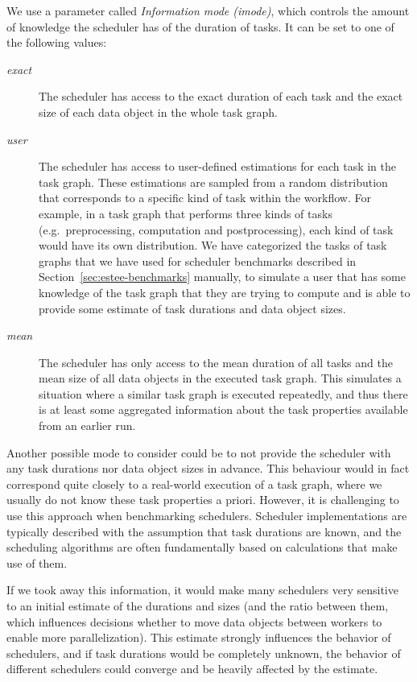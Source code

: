 \begin{description}
		We use a parameter called \emph{Information mode (imode)}, which controls the amount of knowledge the
		scheduler has of the duration of tasks. It can be set to one of the following values:
		\begin{description}
			\item[\emph{exact}] The scheduler has access to the exact duration of each task and the exact size of each data object
				in the whole task graph.
			\item[\emph{user}] The scheduler has access to user-defined estimations for each task in the task graph. These
				estimations are sampled from a random distribution that corresponds to a specific kind of task
				within the workflow. For example, in a task graph that performs three kinds of tasks (e.g.\
				preprocessing, computation and postprocessing), each kind of task would have its own distribution.
				We have categorized the tasks of task graphs that we have used for scheduler benchmarks described
				in Section~\ref{sec:estee-benchmarks} manually, to simulate a user that has some knowledge of the task
				graph that they are trying to compute and is able to provide some estimate of task durations and
				data object sizes.
			\item[\emph{mean}] The scheduler has only access to the mean duration of all tasks and the mean size of all data
				objects in the executed task graph. This simulates a situation where a similar task graph is
				executed repeatedly, and thus there is at least some aggregated information about the task
				properties available from an earlier run.
		\end{description}
		Another possible mode to consider could be to not provide the scheduler with any task durations nor
		data object sizes in advance. This behaviour would in fact correspond quite closely to a real-world
		execution of a task graph, where we usually do not know these task properties a priori. However, it
		is challenging to use this approach when benchmarking schedulers. Scheduler implementations are
		typically described with the assumption that task durations are known, and the scheduling
		algorithms are often fundamentally based on calculations that make use of them.

		If we took away this information, it would make many schedulers very sensitive to an initial
		estimate of the durations and sizes (and the ratio between them, which influences decisions whether
		to move data objects between workers to enable more parallelization). This estimate strongly
		influences the behavior of schedulers, and if task durations would be completely unknown, the
		behavior of different schedulers could converge and be heavily affected by the estimate.


\end{description}
